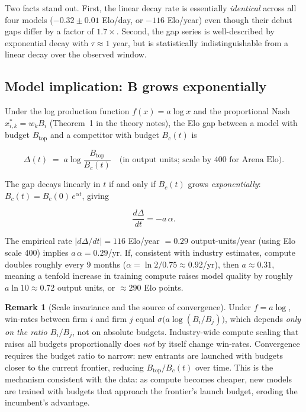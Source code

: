 \documentclass{article}
\theoremstyle{definition}
\newtheorem{remark}{Remark}
\begin{document}
\noindent Two facts stand out.  First, the linear decay rate is essentially
\emph{identical} across all four models ($-0.32 \pm 0.01$ Elo/day,
or $-116$ Elo/year) even though their debut gaps differ by a factor of
$1.7\times$.  Second, the gap series is well-described by exponential
decay with $\tau \approx 1$ year, but is statistically indistinguishable
from a linear decay over the observed window.

\subsection*{Model implication: B grows exponentially}

Under the log production function $f(x) = a\log x$ and the proportional Nash
$x_{i,k}^* = w_k B_i$ (Theorem~1 in the theory notes), the Elo gap between a
model with budget $B_\mathrm{top}$ and a competitor with budget $B_c(t)$ is

\begin{equation}\label{eq:gap}
  \Delta(t) \;=\; a \log\!\frac{B_\mathrm{top}}{B_c(t)}
  \quad \text{(in output units; scale by 400 for Arena Elo)}.
\end{equation}

The gap decays linearly in $t$ if and only if $B_c(t)$ grows
\emph{exponentially}: $B_c(t) = B_c(0)\,e^{\alpha t}$, giving

\[
  \frac{d\Delta}{dt} = -a\,\alpha.
\]

The empirical rate $|d\Delta/dt| = 116$ Elo/year $= 0.29$ output-units/year
(using Elo scale 400) implies $a\,\alpha = 0.29$/yr.
If, consistent with industry estimates, compute doubles roughly every 9 months
($\alpha = \ln 2 / 0.75 \approx 0.92$/yr), then $a \approx 0.31$, meaning a
tenfold increase in training compute raises model quality by roughly $a \ln 10
\approx 0.72$ output units, or $\approx 290$ Elo points.

\begin{remark}[Scale invariance and the source of convergence]
Under $f = a\log$, win-rates between firm $i$ and firm $j$ equal
$\sigma\!\bigl(a\log(B_i/B_j)\bigr)$, which depends \emph{only on the ratio
$B_i/B_j$}, not on absolute budgets.  Industry-wide compute scaling that
raises all budgets proportionally does \emph{not} by itself change win-rates.
Convergence requires the budget ratio to narrow: new entrants are launched with
budgets closer to the current frontier, reducing $B_\mathrm{top}/B_c(t)$ over
time.  This is the mechanism consistent with the data: as compute becomes
cheaper, new models are trained with budgets that approach the frontier's
launch budget, eroding the incumbent's advantage.
\end{remark}
\end{document}
